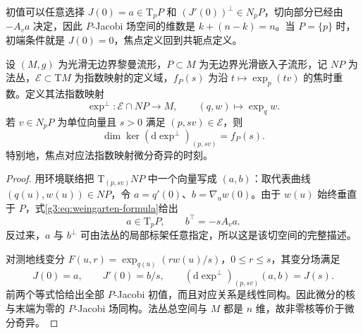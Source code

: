 初值可以任意选择 \(J(0)=a\in\mathrm T_pP\) 和 \((J'(0))^\perp\in N_pP\)，切向部分已经由 \(-A_va\) 决定，因此 \(P\)-Jacobi 场空间的维数是 \(k+(n-k)=n\)。当 \(P=\{p\}\) 时，初端条件就是 \(J(0)=0\)，焦点定义回到共轭点定义。

\begin{proposition}\label{g3:prop:focal-normal-exponential}
	设 \((M,g)\) 为光滑无边界黎曼流形，\(P\subset M\) 为无边界光滑嵌入子流形，记 \(NP\) 为法丛，\(\mathcal E\subset\mathrm TM\) 为指数映射的定义域，\(f_P(s)\) 为沿 \(t\mapsto\exp_p(tv)\) 的焦时重数。定义其法指数映射
	\[
		\exp^\perp:\mathcal E\cap NP\longrightarrow M,\qquad(q,w)\longmapsto\exp_qw.
	\]
	若 \(v\in N_pP\) 为单位向量且 \(s>0\) 满足 \((p,sv)\in\mathcal E\)，则
	\[
		\dim\ker(\mathrm d\exp^\perp)_{(p,sv)}=f_P(s).
	\]
	特别地，焦点对应法指数映射微分奇异的时刻。
\end{proposition}
\begin{proof}
	用环境联络把 \(\mathrm T_{(p,sv)}NP\) 中一个向量写成 \((a,b)\)：取代表曲线 \((q(u),w(u))\in NP\)，令 \(a=q'(0)\)、\(b=\nabla_u w(0)\)。由于 \(w(u)\) 始终垂直于 \(P\)，式\eqref{g3:eq:weingarten-formula}给出
	\[
		a\in\mathrm T_pP,\qquad b^\top=-sA_va.
	\]
	反过来，\(a\) 与 \(b^\perp\) 可由法丛的局部标架任意指定，所以这是该切空间的完整描述。

	对测地线变分
	\(F(u,r)=\exp_{q(u)}(r w(u)/s)\)，\(0\le r\le s\)，其变分场满足
	\[
		J(0)=a,\qquad J'(0)=b/s,\qquad
		(\mathrm d\exp^\perp)_{(p,sv)}(a,b)=J(s).
	\]
	前两个等式恰给出全部 \(P\)-Jacobi 初值，而且对应关系是线性同构。因此微分的核与末端为零的 \(P\)-Jacobi 场同构。法丛总空间与 \(M\) 都是 \(n\) 维，故非零核等价于微分奇异。
\end{proof}

